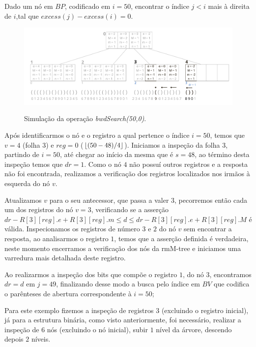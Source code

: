 \begin{example}\label{ex:kary-bwd}
    Dado um nó em $BP$, codificado em $i=50$, encontrar o  índice $j<i$ mais à direita de $i$,tal que $excess(j) - excess(i) = 0$.
    \begin{figure}[htp]
        \centering
          \caption[bwdSearch(50,0).]{Simulação da operação \textit{bwdSearch(50,0)}.}
          \includegraphics[width=\columnwidth]{images/rmm-tree-kary-bwdsearch.png}
          \label{fig:kary-bwdSearch}
     \end{figure}


     Após identificarmos o nó e o registro a qual pertence o índice $i=50$, temos que $v=4$ (folha $3$) e $reg = 0$ ($\lfloor(50-48)/4\rfloor$). Iniciamos a inspeção da folha  $3$, partindo de  $i=50$, até chegar ao início da mesma que é $s=48$, ao término desta inspeção temos que $dr=1$. Como o nó $4$ não possuí outros registros e a resposta não foi encontrada, realizamos a verificação dos registros localizados nos irmãos à esquerda do nó $v$.

     Atualizamos $v$ para o seu antecessor, que passa a valer $3$, pecorremos então cada um dos registros do nó $v=3$, verificando se a asserção $dr - R[3][reg].e + R[3][reg].m \leq d \leq dr - R[3][reg].e + R[3][reg].M$ é válida. Inspecionamos os registros de número $3$ e $2$ do nó $v$ sem encontrar a resposta, ao analisarmos o registro $1$, temos que a asserção definida é verdadeira, neste momento encerramos a verificação dos nós da rmM-tree e iniciamos uma varredura mais detalhada deste registro. 

     Ao realizarmos a inspeção dos bits que compõe o registro $1$, do nó $3$, encontramos $dr=d$ em $j=49$, finalizando desse modo a busca pelo índice em $BV$ que codifica o parênteses de abertura correspondente à $i=50$;
     

     Para este exemplo fizemos a inspeção de registros $3$ (excluindo o registro inicial), já para a estrutura binária, como visto anteriormente, foi necessário, realizar a inspeção de  $6$ nós (excluindo o nó inicial), subir $1$ nível da árvore, descendo depois $2$ níveis.
     
    \end{example}

